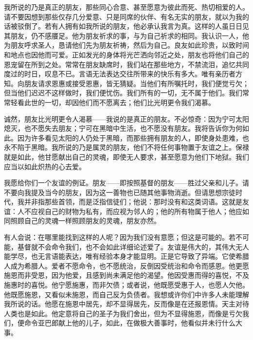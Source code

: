 我所说的乃是真正的朋友，那些同心合意、甚至愿意为彼此而死、热切相爱的人。请不要因想到那些仅存几分爱意、只是同席的伙伴、有名无实的朋友，就以为我的话被驳倒了。若有人拥有如我所说的朋友，他必承认我言为真。这样的人虽日日见其朋友，仍不感餍足。他为朋友祈求的事，与为自己祈求的相同。我认识一人，他为朋友呼求圣人，恳请他们先为朋友祈祷，然后为自己。良友如此珍贵，以致时间和地点也因他而可爱。正如发光的身体将光芒洒向邻近之处，朋友也将他们自己的恩宠留在所到之处。常常在朋友缺席时，我们站在那些地方，不禁流泪，追忆共同度过的时日，叹息不已。言语无法表达交往所带来的快乐有多大。唯有亲历者方知。向朋友请求恩惠或接受恩惠，皆无猜疑。当他们有所嘱托时，我们便觉亏欠；但当他们迟迟不这样做时，我们便忧伤。我们所有的一切，无不属于他们。我们常常轻看此世的一切，却因他们而不愿离去；他们比光明更令我们渴慕。\par

诚然，朋友比光明更令人渴慕——我说的是真正的朋友。不必惊奇：因为宁可太阳熄灭，也不愿失去朋友；宁可在黑暗中生活，也不愿没有朋友。我将告诉你为何如此。因为许多看见太阳的人仍处于黑暗，而那些拥有朋友的人，即使身处患难，也永不陷于黑暗。我所说的乃是属灵的朋友，他们不将任何事物置于友谊之上。保禄就是如此，他甘愿献出自己的灵魂，即使无人要求，甚至愿意为他们下地狱。我们应当以如此炽热的心去爱。\par

我愿给你们一个友谊的例证。朋友——即按照基督的朋友——胜过父亲和儿子。请不要向我提及当今的朋友，因为这一善物也已随其他事物消逝。但请思想宗徒时代，我并非指那些首领，而是泛指信徒们；他说：那时没有和这类词语。这就是友谊：人不应视自己的财物为私有，而应视为邻人的；他的所有物属于他人；他应如同照顾自己的灵魂一样照顾朋友的灵魂，朋友亦然。\par

有人会说：在哪里能找到这样的人呢？因为我们没有意愿；但这是可能的。若不可能，基督就不会命令我们，也不会如此详细论述爱了。友谊是伟大的，其伟大无人能学尽，也无言语能表达，唯有经验本身才能显明。正是它导致了异端。它使希腊人成为希腊人。爱者不愿命令，也不愿统治，反倒因受统治和命令而感恩。他更愿施恩而非受恩，因为他爱，且感到尚未满足他的渴望。他因受惠而得的喜悦，不及施惠时的喜悦。他宁愿施惠，而非欠债；或者说，他既愿受惠于人，也愿人欠他。他既愿施恩，又看似未施恩，而自己反为负债者。我想或许你们中许多人未能理解我所说的话。他愿在施恩中居先，却不显得居先，反而像是在还报恩情。天主对待人类也是如此。他定意将自己的圣子为我们舍出，但为不显得施恩，而像是亏欠我们，便命令亚巴郎献上他的儿子，如此，在做极大善事时，他看似并未行什么大事。\par

